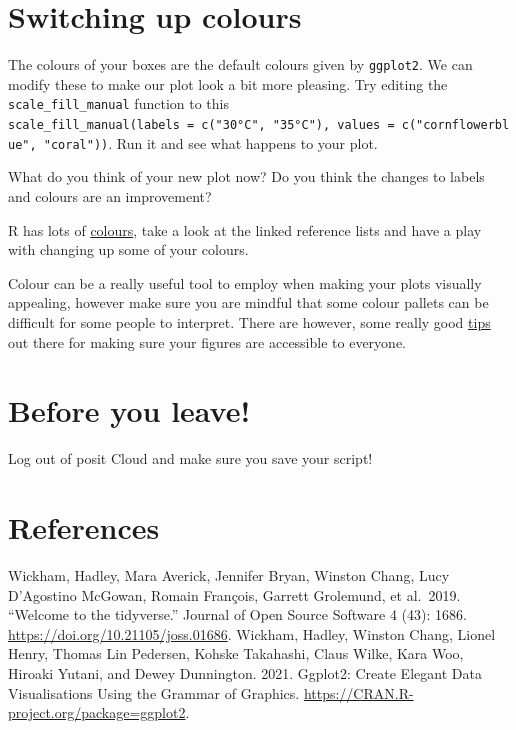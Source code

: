 \documentclass[
]{book}
\begin{document}
\section{Switching up colours}\label{colours}

The colours of your boxes are the default colours given by \texttt{ggplot2}. We can modify these to make our plot look a bit more pleasing. Try editing the \texttt{scale\_fill\_manual} function to this \texttt{scale\_fill\_manual(labels\ =\ c("30°C",\ "35°C"),\ values\ =\ c("cornflowerblue",\ "coral"))}. Run it and see what happens to your plot.

What do you think of your new plot now? Do you think the changes to labels and colours are an improvement?

R has lots of \href{https://www.datanovia.com/en/blog/awesome-list-of-657-r-color-names/}{colours}, take a look at the linked reference lists and have a play with changing up some of your colours.

Colour can be a really useful tool to employ when making your plots visually appealing, however make sure you are mindful that some colour pallets can be difficult for some people to interpret. There are however, some really good \href{https://www.tableau.com/en-gb/about/blog/examining-data-viz-rules-dont-use-red-green-together\#:~:text=Use\%20a\%20colour\%2Dblind\%2Dfriendly\%20palette\%20when\%20appropriate&text=For\%20example\%2C\%20blue\%2Forange\%20is,blue\%20to\%20someone\%20with\%20CVD}{tips} out there for making sure your figures are accessible to everyone.

\section{Before you leave!}\label{before-you-leave-4}

Log out of posit Cloud and make sure you save your script!

\section{References}\label{references-5}

Wickham, Hadley, Mara Averick, Jennifer Bryan, Winston Chang, Lucy D'Agostino McGowan, Romain François, Garrett Grolemund, et al.~2019. ``Welcome to the tidyverse.'' Journal of Open Source Software 4 (43): 1686. \url{https://doi.org/10.21105/joss.01686}.
Wickham, Hadley, Winston Chang, Lionel Henry, Thomas Lin Pedersen, Kohske Takahashi, Claus Wilke, Kara Woo, Hiroaki Yutani, and Dewey Dunnington. 2021. Ggplot2: Create Elegant Data Visualisations Using the Grammar of Graphics. \url{https://CRAN.R-project.org/package=ggplot2}.
\end{document}
